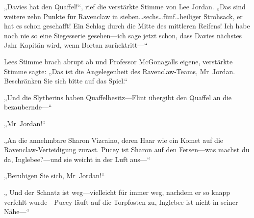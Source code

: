 „Davies hat den Quaffel!“, rief die verstärkte Stimme von Lee Jordan.
„Das sind weitere zehn Punkte für Ravenclaw in sieben…sechs…fünf…heiliger Strohsack, er hat es schon geschafft! Ein Schlag durch die Mitte des mittleren Reifens! Ich habe noch nie so eine Siegesserie gesehen—ich sage jetzt schon, dass Davies nächstes Jahr Kapitän wird, wenn Bortan zurücktritt—“

Lees Stimme brach abrupt ab und Professor McGonagalls eigene, verstärkte Stimme sagte: „Das ist die Angelegenheit des Ravenclaw-Teams, Mr~Jordan. Beschränken Sie sich bitte auf das Spiel.“

„Und die Slytherins haben Quaffelbesitz—Flint übergibt den Quaffel an die bezaubernde—“

„Mr~Jordan!“

„An die annehmbare Sharon Vizcaino, deren Haar wie ein Komet auf die Ravenclaw-Verteidigung zurast. Pucey ist Sharon auf den Fersen—was machst du da, Inglebee?—und sie weicht in der Luft aus—“

„Beruhigen Sie sich, Mr~Jordan!“

„ Und der Schnatz ist weg—vielleicht für immer weg, nachdem er so knapp verfehlt wurde—Pucey läuft auf die Torpfosten zu, Inglebee ist nicht in seiner Nähe—“

